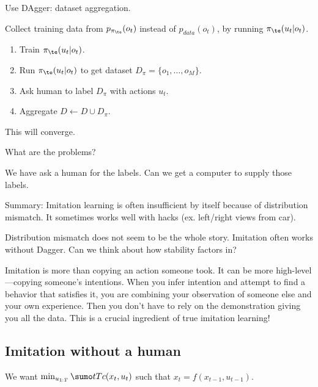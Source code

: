 Use DAgger: dataset aggregation. 

Collect training data from $p_{\pi_\te}(o_t)$ instead of $p_{data}(o_t)$, by running $\pi_\te(u_t|o_t)$.

\begin{enumerate}
\item
Train $\pi_\te(u_t|o_t)$.
\item
Run $\pi_\te(u_t|o_t)$ to get dataset $D_\pi = \{o_1,\ldots, o_M\}$.
\item
Ask human to label $D_\pi$ with actions $u_t$.
\item
Aggregate $D\leftarrow D\cup D_\pi$.
\end{enumerate}
This will converge.


What are the problems?

We have ask a human for the labels. Can we get a computer to supply those labels.

Summary: Imitation learning is often insufficient by itself because of distribution mismatch. It sometimes works well with hacks (ex. left/right views from car).


Distribution mismatch does not seem to be the whole story. Imitation often works without Dagger. Can we think about how stability factors in?



Imitation is more than copying an action someone took. It can be more high-level---copying someone's intentions. When you infer intention and attempt to find a behavior that satisfies it, you are combining your observation of someone else and your own experience. Then you don't have to rely on the demonstration giving you all the data. This is a crucial ingredient of true imitation learning!

\subsection{Imitation without a human}

We want $\min_{u_{1:T}} \sumo tT c(x_t,u_t) $
such that $x_t=f(x_{t-1},u_{t-1})$. 

